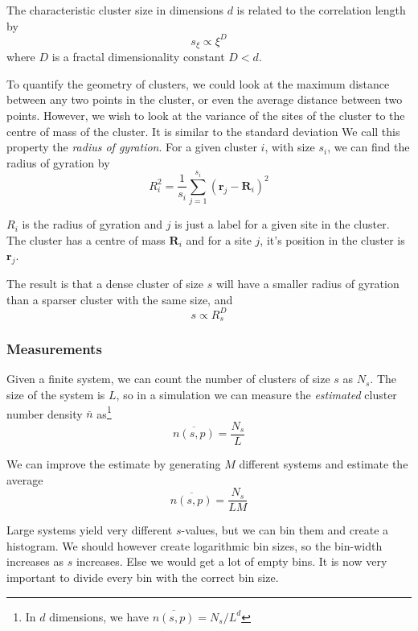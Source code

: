 \documentclass[11pt]{article}
\numberwithin{equation}{section}
\numberwithin{figure}{section}
\newcommand{\ita}[1]{\textit{#1}}
\renewcommand\vec[1]{\mathbf{#1}}
\renewcommand\vec[1]{\mathbf{#1}}
\renewcommand\vec[1]{\mathbf{#1}}
\begin{document}
The characteristic cluster size in dimensions $d$ is related
to the correlation length by
\begin{equation}
    s_{\xi} \propto \xi^D
\end{equation}
where $D$ is a fractal dimensionality constant $D<d$.

To quantify the geometry of clusters, we could look
at the maximum distance between any two points in the cluster,
or even the average distance between two points.
However, we wish to look at the
variance of the sites of the cluster to the centre of mass
of the cluster. It is similar to the standard deviation
We call this property the
\ita{radius of gyration}. For a given cluster $i$,
with size $s_i$, we can find the radius of gyration by
\begin{equation}
    R^2_i = \frac{1}{s_i}
    \sum_{j=1}^{s_i}{(\vec r_j - \vec R_i)}^2
\end{equation}

$R_i$ is the radius of gyration and $j$ is just a label for a given
site in the cluster. The cluster has a centre of mass $\vec R_i$
and for a site $j$, it's position in the cluster is $\vec r_j$.

The result is that a dense cluster of size $s$ will have
a smaller radius of gyration than a sparser cluster with
the same size, and
\begin{equation}
    s\propto R_s^D
\end{equation}

\subsubsection{Measurements}
Given a finite system, we can count the number of
clusters of size $s$ as $N_s$. The size of the system is
$L$, so in a simulation we can measure the \ita{estimated} 
cluster number density $\bar n$ 
as\footnote{In $d$ dimensions, we have 
    $\overline{n(s,p)} = N_s/L^d$}
\begin{equation}
    \overline{n(s,p)} = \frac{N_s}{L}
\end{equation}

We can improve the estimate by generating $M$ different systems
and estimate the average
\begin{equation}
    \overline{n(s,p)} = \frac{N_s}{L M}
\end{equation}

Large systems yield very different $s$-values, but we
can bin them and create a histogram.
We should however create logarithmic bin sizes,
so the bin-width increases as $s$ increases.
Else we would get a lot of empty bins.
It is now very important to divide every bin with the correct
bin size.
\end{document}
